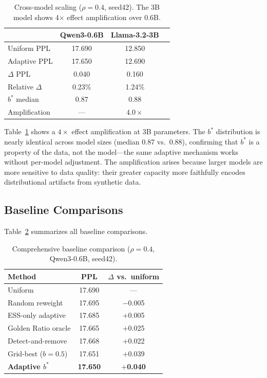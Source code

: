 \documentclass[11pt,a4paper]{article}
\newcommand{\bstar}{b^{*}}
\begin{document}
\begin{table}[t]
\centering
\small
\caption{Cross-model scaling ($\rho{=}0.4$, seed42). The 3B model shows 4$\times$ effect amplification over 0.6B.}
\label{tab:3b}
\begin{tabular}{lccc}
\toprule
& \textbf{Qwen3-0.6B} & \textbf{Llama-3.2-3B} \\
\midrule
Uniform PPL      & 17.690 & 12.850 \\
Adaptive PPL     & 17.650 & 12.690 \\
$\Delta$ PPL     & 0.040  & 0.160 \\
Relative $\Delta$ & 0.23\% & 1.24\% \\
$\bstar$ median  & 0.87   & 0.88 \\
Amplification    & ---    & $4.0\times$ \\
\bottomrule
\end{tabular}
\end{table}

Table~\ref{tab:3b} shows a $4\times$ effect amplification at 3B parameters.
The $\bstar$ distribution is nearly identical across model sizes (median 0.87 vs.\ 0.88), confirming that $\bstar$ is a property of the data, not the model---the same adaptive mechanism works without per-model adjustment.
The amplification arises because larger models are more sensitive to data quality: their greater capacity more faithfully encodes distributional artifacts from synthetic data.


\subsection{Baseline Comparisons}
\label{sec:baselines}

Table~\ref{tab:baselines} summarizes all baseline comparisons.

\begin{table}[t]
\centering
\small
\caption{Comprehensive baseline comparison ($\rho{=}0.4$, Qwen3-0.6B, seed42).}
\label{tab:baselines}
\begin{tabular}{lcc}
\toprule
\textbf{Method} & \textbf{PPL} & $\Delta$ vs.\ uniform \\
\midrule
Uniform             & 17.690 & --- \\
Random reweight     & 17.695 & $-$0.005 \\
ESS-only adaptive   & 17.685 & $+$0.005 \\
Golden Ratio oracle & 17.665 & $+$0.025 \\
Detect-and-remove   & 17.668 & $+$0.022 \\
Grid-best ($b{=}0.5$) & 17.651 & $+$0.039 \\
\textbf{Adaptive $\bstar$} & \textbf{17.650} & $+$\textbf{0.040} \\
\bottomrule
\end{tabular}
\end{table}
\end{document}
